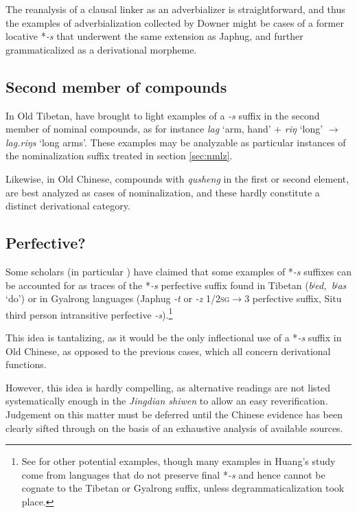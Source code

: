 \documentclass[oneside,a4paper,11pt]{article}
\newcommand{\ipa}[1]{{\phon\textit{\mbox{#1}}}}
\begin{document}
The reanalysis of a clausal linker as an adverbializer is straightforward, and thus the examples of adverbialization collected by Downer might be cases of a former locative *\ipa{-s} that underwent the same extension as Japhug, and further grammaticalized as a derivational morpheme.
 

\subsection{Second member of compounds}
In Old Tibetan, \citet{uebach08rjeblas} have brought to light examples of a \ipa{-s} suffix in the second member of nominal compounds, as for instance \ipa{lag} `arm, hand' + \ipa{riŋ} `long' $\rightarrow$ \ipa{lag.riŋs} `long arms'. These examples may be analyzable as particular instances of the nominalization suffix treated in section \ref{sec:nmlz}.

Likewise, in Old Chinese, compounds with \textit{qusheng} in the first or second element, are best analyzed as cases of nominalization, and these hardly constitute a distinct derivational category.
 
\subsection{Perfective?} \label{sec:perf}
Some scholars (in particular \citealt{jinlx06}) have claimed that some examples of *\ipa{-s} suffixes can be accounted for as traces of the *\ipa{-s} perfective suffix found in Tibetan (\ipa{bʲed, bʲas} `do') or in Gyalrong languages (Japhug \ipa{-t} or \ipa{-z} \textsc{1/2sg}$\rightarrow$3 perfective suffix, Situ third person intransitive perfective \ipa{-s}).\footnote{See \citet{huangbf97s.houzhui} for other potential examples, though many examples in Huang's study come from languages that do not preserve final *\ipa{-s} and hence cannot be cognate to the Tibetan or Gyalrong suffix, unless degrammaticalization took place.}

This idea is tantalizing, as it would be the only inflectional use of a *\ipa{-s} suffix in Old Chinese, as opposed to the previous cases, which all concern derivational functions.

However, this idea is hardly compelling, as alternative readings are not listed systematically enough in the \textit{Jingdian shiwen} to allow an easy reverification. Judgement on this matter must be deferred until the Chinese evidence has been clearly sifted through on the basis of an exhaustive analysis of available sources.
\end{document}
